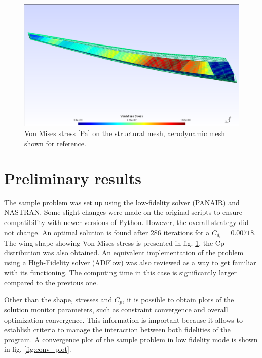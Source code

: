 \begin{figure}[H]
    \centering
    \includegraphics[width=\linewidth]{images/structure_aeromesh.PNG}
    \caption{Von Mises stress [Pa] on the structural mesh, aerodynamic mesh shown for reference.}
    \label{fig:structure_aeromesh}
\end{figure}

\section{Preliminary results}
\label{sec:results}

The sample problem was set up using the low-fidelity solver (PANAIR) and NASTRAN. Some slight changes were made on the original scripts to ensure compatibility with newer versions of Python. However, the overall strategy did not change. An optimal solution is found after 286 iterations for a $C_{d_i}=0.00718$. The wing shape showing Von Mises stress is presented in fig. \ref{fig:structure_aeromesh}, the Cp distribution was also obtained. An equivalent implementation of the problem using a High-Fidelity solver (ADFlow) was also reviewed as a way to get familiar with its functioning. The computing time in this case is significantly larger compared to the previous one. \par
Other than the shape, stresses and $C_p$, it is possible to obtain plots of the solution monitor parameters, such as constraint convergence and overall optimization convergence. This information is important because it allows to establish criteria to manage the interaction between both fidelities of the program. A convergence plot of the sample problem in low fidelity mode is shown in fig.  \ref{fig:conv_plot}.

